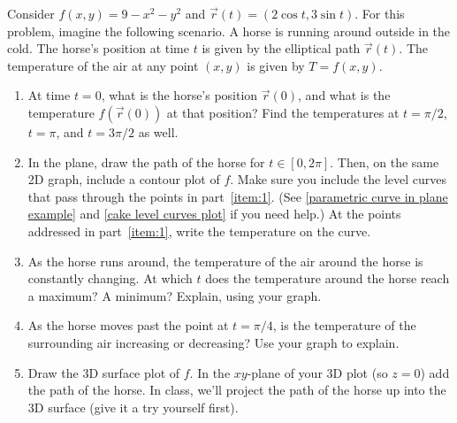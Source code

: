 \begin{problem}\label{horse track chain rule introduction}
 Consider $f(x,y)=9-x^2-y^2$ and $\vec r(t)=(2\cos t, 3\sin t)$. For this problem, imagine the following scenario.  A horse is running around outside in the cold. The horse's position at time $t$ is given by the elliptical path $\vec r(t)$. The temperature of the air at any point $(x,y)$ is given by $T=f(x,y)$.  
\begin{enumerate}
 \item\label{item:1} At time $t=0$, what is the horse's position $\vec r(0)$, and what is the temperature $f(\vec r(0))$ at that position? Find the temperatures at $t=\pi/2$, $t=\pi$, and $t=3\pi/2$ as well. 
 \item In the plane, draw the path of the horse for $t\in [0,2\pi]$. Then, on the same 2D graph, include a contour plot of $f$. Make sure you include the level curves that pass through the points in part~\ref{item:1}. (See  \ref{parametric curve in plane example} and \ref{cake level curves plot} if you need help.) At the points addressed in part~\ref{item:1}, write the temperature on the curve.
 \item{}%
 As the horse runs around, the temperature of the air around the horse is constantly changing. 
At which $t$ does the temperature around the horse reach a maximum?  A minimum?  Explain, using your graph. 
 \item\label{item:2} As the horse moves past the point at $t=\pi/4$, is the temperature of the surrounding air increasing or decreasing? Use your graph to explain.
 \item {}%
Draw the 3D surface plot of $f$. In the $xy$-plane of your 3D plot (so $z=0$) add the path of the horse. In class, we'll project the path of the horse up into the 3D surface (give it a try yourself first). 
\end{enumerate}
\end{problem}

